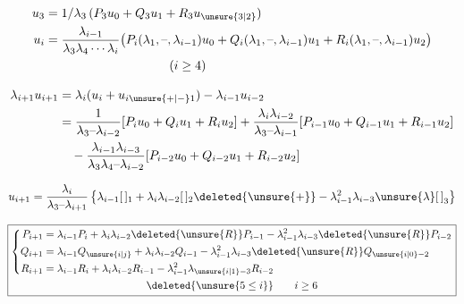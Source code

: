 
\begingroup
\makeatletter
\tagsleft@true
\makeatother

{\scriptsize
\[
\begin{aligned}
u_3&=1/\lambda_3\,(P_3u_0+Q_3u_1+R_3u_{\unsure{3|2}})\\
u_i&=\frac{\lambda_{i-1}}{\lambda_3\lambda_4\cdots\lambda_i}
 \big(P_i(\lambda_1,\text{--},\lambda_{i-1})u_0+
 Q_i(\lambda_1,\text{--},\lambda_{i-1})u_1+
 R_i(\lambda_1,\text{--},\lambda_{i-1})u_2\big)\\
&\hspace{10em}(i\geq4)
\end{aligned}
\]
}

{\scriptsize
\[
\begin{aligned}
\lambda_{i+1}u_{i+1}
 &=\lambda_i(u_i+u_{i\unsure{+|-}1})-\lambda_{i-1}u_{i-2}\\
 &=\frac{1}{\lambda_3\text{--}\lambda_{i-2}}[P_i u_0+Q_i u_1+R_i u_2]
 +\frac{\lambda_i\lambda_{i-2}}{\lambda_3\text{--}\lambda_{i-1}}[P_{i-1}u_0+Q_{i-1}u_1+R_{i-1}u_2]\\
 &\quad-\frac{\lambda_{i-1}\lambda_{i-3}}{\lambda_3\lambda_4\text{--}\lambda_{i-2}}[P_{i-2}u_0+Q_{i-2}u_1+R_{i-2}u_2]
\end{aligned}
\]
}

\[
u_{i+1}=\frac{\lambda_i}{\lambda_3\text{--}\lambda_{i+1}}
\left\{\lambda_{i-1}[\,]_1+\lambda_i\lambda_{i-2}[\,]_2
\deleted{\unsure{+}}-\lambda_{i-1}^2\lambda_{i-3}\unsure{\lambda}[\,]_3\right\}
\]


\[
\boxed{\begin{gathered}
\left\{\begin{aligned}
P_{i+1}&=\lambda_{i-1}P_i+\lambda_i\lambda_{i-2}\deleted{\unsure{R}}P_{i-1}-\lambda_{i-1}^2\lambda_{i-3}\deleted{\unsure{R}}P_{i-2}\\
Q_{i+1}&=\lambda_{i-1}Q_{\unsure{i|j}}+\lambda_i\lambda_{i-2}Q_{i-1}-\lambda_{i-1}^2\lambda_{i-3}\deleted{\unsure{R}}Q_{\unsure{i|0}-2}\\
R_{i+1}&=\lambda_{i-1}R_i+\lambda_i\lambda_{i-2}R_{i-1}-\lambda_{i-1}^2\lambda_{\unsure{i|1}-3}R_{i-2}
\end{aligned}\right.\\
\deleted{\unsure{5\leq i}}\qquad i\geq6
\end{gathered}}
\]

